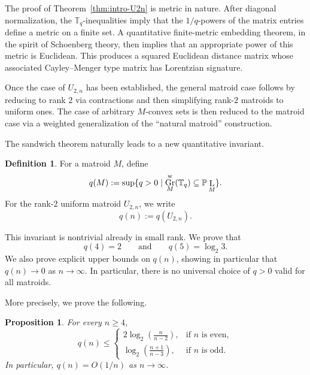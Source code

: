 \documentclass[12pt]{amsart}
\newtheorem{proposition}[theorem]{Proposition}
\theoremstyle{definition}
\newtheorem{definition}[theorem]{Definition}
\newcommand{\1}{\mathbf{1}}
\DeclareMathOperator{\upL}{L}   %
\DeclareMathOperator{\Gr}{Gr}
\renewcommand\P{{\mathbb P}}
\newcommand\T{{\mathbb T}}
\newcommand{\mk}[2][]{\todo[color=orange, #1]{\textbf{Mario}: #2}}
\newcommand\ol{\texorpdfstring{\textbf{Oliver:} }{Oliver: }}
\begin{document}
The proof of Theorem~\ref{thm:intro-U2n} is metric in nature. After diagonal normalization, the $\T_q$-inequalities imply that the $1/q$-powers of the matrix entries define a metric on a finite set. A quantitative finite-metric embedding theorem, in the spirit of Schoenberg theory, then implies that an appropriate power of this metric is Euclidean. This produces a squared Euclidean distance matrix whose associated Cayley--Menger type matrix has Lorentzian signature. 

Once the case of $U_{2,n}$ has been established, the general matroid case follows by
reducing to rank $2$ via contractions and then simplifying rank-$2$ matroids to uniform ones.
The case of arbitrary $M$-convex sets is then reduced to the matroid case via a weighted generalization of the ``natural matroid'' construction.

\medskip

The sandwich theorem naturally leads to a new quantitative invariant.

\begin{definition}
For a matroid $M$, define
\[
q(M):=\sup\{q>0 \mid \Gr^{\rm w}_M(\T_q)\subseteq \P\upL_M\}.
\]
For the rank-$2$ uniform matroid $U_{2,n}$, we write
\[
q(n):=q(U_{2,n}).
\]
\end{definition}

This invariant is nontrivial already in small rank. We prove that
\[
q(4)=2
\qquad\text{and}\qquad
q(5)=\log_2 3.
\]
We also prove explicit upper bounds on $q(n)$, showing in particular that $q(n)\to 0$ as $n\to\infty$. In particular, there is no universal choice of $q>0$ valid for all matroids.

More precisely, we prove the following.

\begin{proposition}
\label{prop:intro-upper-bound}
For every $n\ge 4$,
\[
q(n)\le
\begin{cases}
2\log_2\!\left(\frac{n}{n-2}\right), & \text{if } n \text{ is even},\\[1ex]
\log_2\!\left(\frac{n+1}{n-3}\right), & \text{if } n \text{ is odd}.
\end{cases}
\]
In particular, $q(n)=O(1/n)$ as $n\to\infty$.
\end{proposition}
\end{document}
